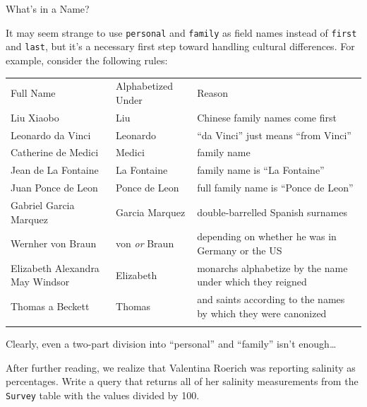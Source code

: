 \documentclass{book}
\begin{document}
\begin{swcbox}{What's in a Name?}

It may seem strange to use \texttt{personal} and \texttt{family} as
field names instead of \texttt{first} and \texttt{last}, but it's a
necessary first step toward handling cultural differences. For example,
consider the following rules:

\begin{tabular}{@{}lll@{}}
\hline\noalign{\medskip}
Full Name & Alphabetized Under & Reason
\\\noalign{\medskip}
\hline\noalign{\medskip}
Liu Xiaobo & Liu & Chinese family names come first
\\\noalign{\medskip}
Leonardo da Vinci & Leonardo & ``da Vinci'' just means ``from Vinci''
\\\noalign{\medskip}
Catherine de Medici & Medici & family name
\\\noalign{\medskip}
Jean de La Fontaine & La Fontaine & family name is ``La Fontaine''
\\\noalign{\medskip}
Juan Ponce de Leon & Ponce de Leon & full family name is ``Ponce de
Leon''
\\\noalign{\medskip}
Gabriel Garcia Marquez & Garcia Marquez & double-barrelled Spanish
surnames
\\\noalign{\medskip}
Wernher von Braun & von \emph{or} Braun & depending on whether he was in
Germany or the US
\\\noalign{\medskip}
Elizabeth Alexandra May Windsor & Elizabeth & monarchs alphabetize by
the name under which they reigned
\\\noalign{\medskip}
Thomas a Beckett & Thomas & and saints according to the names by which
they were canonized
\\\noalign{\medskip}
\hline
\end{tabular}

Clearly, even a two-part division into ``personal'' and ``family'' isn't
enough\ldots{}

\end{swcbox}

\begin{challenge}
  After further reading, we realize that Valentina Roerich was reporting
  salinity as percentages. Write a query that returns all of her
  salinity measurements from the \texttt{Survey} table with the values
  divided by 100.
\end{challenge}
\end{document}
